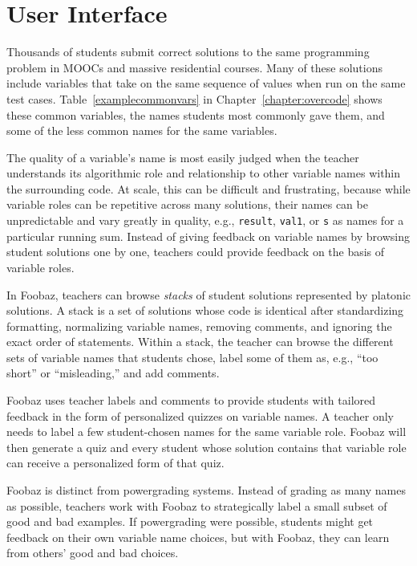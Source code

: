 
\section{User Interface}

Thousands of students submit correct solutions to the same programming problem in MOOCs and massive residential courses. Many of these solutions include variables that take on the same sequence of values when run on the same test cases. Table~\ref{examplecommonvars} in Chapter~\ref{chapter:overcode} shows these common variables, the names students most commonly gave them, and some of the less common names for the same variables.

The quality of a variable's name is most easily judged when the teacher understands its algorithmic role and relationship to other variable names within the surrounding code. At scale, this can be difficult and frustrating, because while variable roles can be repetitive across many solutions, their names can be unpredictable and vary greatly in quality, e.g., \texttt{result}, \texttt{val1}, or \texttt{s} as names for a particular running sum. Instead of giving feedback on variable names by browsing student solutions one by one, teachers could provide feedback on the basis of variable roles.

In Foobaz, teachers can browse \emph{stacks} of student solutions represented by platonic solutions. A stack is a set of solutions whose code is identical after standardizing formatting, normalizing variable names, removing comments, and ignoring the exact order of statements. Within a stack, the teacher can browse the different sets of variable names that students chose, label some of them as, e.g., ``too short'' or ``misleading,'' and add comments. 

Foobaz uses teacher labels and comments to provide students with tailored feedback in the form of personalized quizzes on variable names. A teacher only needs to label a few student-chosen names for the same variable role. Foobaz will then generate a quiz and every student whose solution contains that variable role can receive a personalized form of that quiz. %

Foobaz is distinct from powergrading systems. Instead of grading as many names as possible, teachers work with Foobaz to strategically label a small subset of good and bad examples. If powergrading were possible, students might get feedback on their own variable name choices, but with Foobaz, they can learn from others' good and bad choices.

